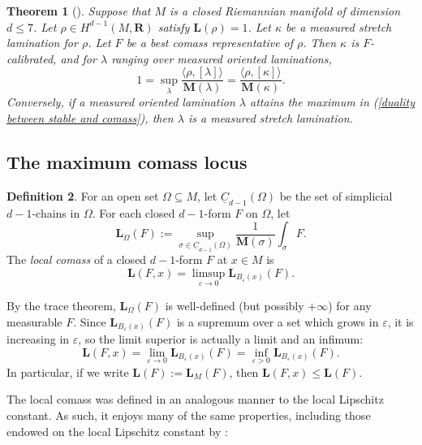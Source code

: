\documentclass[reqno,11pt]{amsart}
\newcommand{\RR}{\mathbf{R}}
\newcommand{\Chain}{\underline C}
\newcommand{\Mass}{\mathbf M}
\newcommand{\Comass}{\mathbf L}
\newcommand{\dfn}[1]{\emph{#1}\index{#1}}
\newtheorem{theorem}{Theorem}[section]
\theoremstyle{definition}
\newtheorem{definition}[theorem]{Definition}
\numberwithin{equation}{section}
\begin{document}
\begin{theorem}[{\cite[Theorem B]{BackusBest1}}]\label{lams are calibrated}\label{calibrated means measured stretch}
Suppose that $M$ is a closed Riemannian manifold of dimension $d \leq 7$.
Let $\rho \in H^{d - 1}(M, \RR)$ satisfy $\Comass(\rho) = 1$.
Let $\kappa$ be a measured stretch lamination for $\rho$.
Let $F$ be a best comass representative of $\rho$.
Then $\kappa$ is $F$-calibrated, and for $\lambda$ ranging over measured oriented laminations,
\begin{equation}\label{duality between stable and comass}
1 = \sup_\lambda \frac{\langle \rho, [\lambda]\rangle}{\Mass(\lambda)} = \frac{\langle \rho, [\kappa]\rangle}{\Mass(\kappa)}.
\end{equation}
Conversely, if a measured oriented lamination $\lambda$ attains the maximum in (\ref{duality between stable and comass}), then $\lambda$ is a measured stretch lamination.
\end{theorem}

\subsection{The maximum comass locus}
\begin{definition}
For an open set $\Omega \subseteq M$, let $\Chain_{d - 1}(\Omega)$ be the set of simplicial $d - 1$-chains in $\Omega$.
For each closed $d - 1$-form $F$ on $\Omega$, let
$$\Comass_\Omega(F) := \sup_{\sigma \in \Chain_{d - 1}(\Omega)} \frac{1}{\Mass(\sigma)} \int_\sigma F.$$
The \dfn{local comass} of a closed $d - 1$-form $F$ at $x \in M$ is 
$$\Comass(F, x) = \limsup_{\varepsilon \to 0} \Comass_{B_\varepsilon(x)}(F).$$
\end{definition}

By the trace theorem, $\Comass_\Omega(F)$ is well-defined (but possibly $+\infty$) for any measurable $F$.
Since $\Comass_{B_\varepsilon(x)}(F)$ is a supremum over a set which grows in $\varepsilon$, it is increasing in $\varepsilon$, so the limit superior is actually a limit and an infimum:
$$\Comass(F, x) = \lim_{\varepsilon \to 0} \Comass_{B_\varepsilon(x)}(F) = \inf_{\varepsilon > 0} \Comass_{B_\varepsilon(x)}(F).$$
In particular, if we write $\Comass(F) := \Comass_M(F)$, then $\Comass(F, x) \leq \Comass(F)$.

The local comass was defined in an analogous manner to the local Lipschitz constant.
As such, it enjoys many of the same properties, including those endowed on the local Lipschitz constant by \cite[Lemma 4.3]{Crandall2008}:
\end{document}

